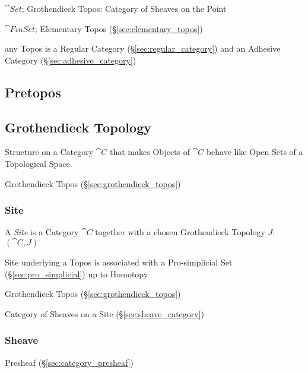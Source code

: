 $\cat{Set}$; Grothendieck Topos: Category of Sheaves on the Point

$\cat{FinSet}$; Elementary Topos (\S\ref{sec:elementary_topos})

any Topos is a Regular Category (\S\ref{sec:regular_category}) and an
Adhesive Category (\S\ref{sec:adhesive_category})



\subsection{Pretopos}\label{sec:pretopos}

\subsection{Grothendieck Topology}\label{sec:grothendieck_topology}

Structure on a Category $\cat{C}$ that makes Objects of
$\cat{C}$ behave like Open Sets of a Topological Space.

Grothendieck Topos (\S\ref{sec:grothendieck_topos})



\subsubsection{Site}\label{sec:site}

A \emph{Site} is a Category $\cat{C}$ together with a chosen
Grothendieck Topology $J$: $(\cat{C},J)$

Site underlying a Topos is associated with a Pro-simplicial Set
(\S\ref{sec:pro_simplicial}) up to Homotopy

Grothendieck Topos (\S\ref{sec:grothendieck_topos})

Category of Sheaves on a Site (\S\ref{sec:sheave_category})



\subsubsection{Sheave}\label{sec:sheave}

Presheaf (\S\ref{sec:category_presheaf})



